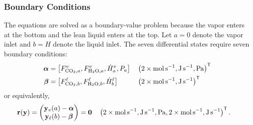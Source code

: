             \subsubsection{Boundary Conditions}
                The equations are solved as a boundary-value problem because the vapor enters at the bottom and the lean liquid enters at the top. Let $a=0$ denote the vapor inlet and $b=H$ denote the liquid inlet. The seven differential states require seven boundary conditions:
                \begin{align}
                    \boldsymbol{\alpha} &= \left[F^{\vap}_{ \COtwo, a}, F^{\vap}_{ \HtwoO, a}, \dot{H}^{\vap}_{ a}, P_a\right]
                    && \left(
                    2\times\unit{mol\,s^{-1}},
                    \unit{J\,s^{-1}},
                    \unit{Pa}
                    \right)^{\mathsf{T}}\\
                    \boldsymbol{\beta} &= \left[F^{\liq}_{ \COtwo, b}, F^{\liq}_{ \HtwoO, b}, \dot{H}^{\liq}_{ b}\right]
                    && \left(
                    2\times\unit{mol\,s^{-1}},
                    \unit{J\,s^{-1}}
                    \right)^{\mathsf{T}}
                \end{align}
                or equivalently,
                \begin{align}
                    \mathbf{r}(\mathbf{y}) &=
                    \begin{pmatrix}
                        \mathbf{y}_{\vap}(a)-\boldsymbol{\alpha}\\
                        \mathbf{y}_{\liq}(b)-\boldsymbol{\beta}
                    \end{pmatrix}
                    =
                    \mathbf{0}
                    && \left(
                    2\times\unit{mol\,s^{-1}},
                    \unit{J\,s^{-1}},
                    \unit{Pa},
                    2\times\unit{mol\,s^{-1}},
                    \unit{J\,s^{-1}}
                    \right)^{\mathsf{T}}.
                \end{align}
